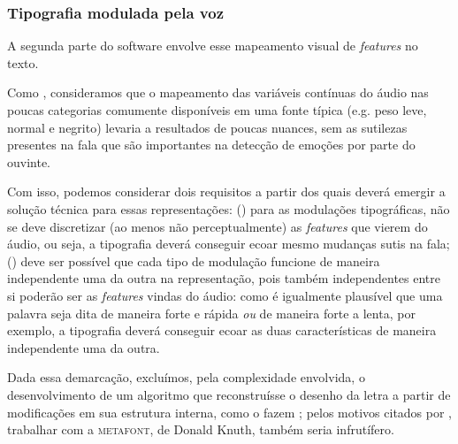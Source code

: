 \documentclass[a4paper,11pt,titlepage,singlespacing]{article}
\newcommand{\num}[1]{(\oldstylenums{#1})}
\begin{document}
\subsubsection*{Tipografia modulada pela voz}

A segunda parte do software envolve esse mapeamento visual de \textit{features} no texto. 

Como , consideramos que o mapeamento das variáveis contínuas do áudio nas poucas categorias comumente disponíveis em uma fonte típica (e.g. peso leve, normal e negrito) levaria a resultados de poucas nuances, sem as sutilezas presentes na fala que são importantes na detecção de emoções por parte do ouvinte.


Com isso, podemos considerar dois requisitos a partir dos quais deverá emergir a solução técnica para essas representações: \num{1} para as modulações tipográficas, não se deve discretizar (ao menos não perceptualmente) as \textit{features} que vierem do áudio, ou seja, a tipografia deverá conseguir ecoar mesmo mudanças sutis na fala; \num{2} deve ser possível que cada tipo de modulação funcione de maneira independente uma da outra na representação, pois também independentes entre si poderão ser as \textit{features} vindas do áudio: como é igualmente plausível que uma palavra seja dita de maneira forte e rápida \textit{ou} de maneira forte a lenta, por exemplo, a tipografia deverá conseguir ecoar as duas características de maneira independente uma da outra.

Dada essa demarcação, excluímos, pela complexidade envolvida, o desenvolvimento de um algoritmo que reconstruísse o desenho da letra a partir de modificações em sua estrutura interna, como o fazem ; pelos motivos citados por , trabalhar com a \textsc{metafont}, de Donald Knuth, também seria infrutífero.
\end{document}
